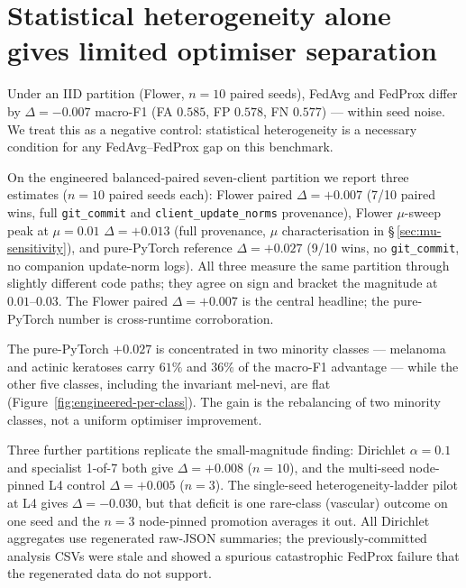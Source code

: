 \documentclass[11pt,a4paper]{report}
\begin{document}


\section{Statistical heterogeneity alone gives limited optimiser separation}
\label{sec:statistical-heterogeneity}

Under an IID partition (Flower, $n=10$ paired seeds), FedAvg and FedProx
differ by $\Delta = -0.007$ macro-F1 (FA $0.585$, FP $0.578$, FN $0.577$) ---
within seed noise. We treat this as a negative control: statistical
heterogeneity is a necessary condition for any FedAvg--FedProx gap on this
benchmark.

On the engineered balanced-paired seven-client partition we report three
estimates ($n=10$ paired seeds each): Flower paired $\Delta = +0.007$ (7/10
paired wins, full \texttt{git\_commit} and \texttt{client\_update\_norms}
provenance), Flower $\mu$-sweep peak at $\mu = 0.01$ $\Delta = +0.013$ (full
provenance, $\mu$ characterisation in \S\,\ref{sec:mu-sensitivity}), and
pure-PyTorch reference $\Delta = +0.027$ (9/10 wins, no \texttt{git\_commit},
no companion update-norm logs). All three measure the same partition through
slightly different code paths; they agree on sign and bracket the magnitude
at $0.01$--$0.03$. The Flower paired $\Delta = +0.007$ is the central
headline; the pure-PyTorch number is cross-runtime corroboration.

The pure-PyTorch $+0.027$ is concentrated in two minority classes --- melanoma
and actinic keratoses carry $61\%$ and $36\%$ of the macro-F1 advantage --- while
the other five classes, including the invariant mel-nevi, are flat
(Figure~\ref{fig:engineered-per-class}). The gain is the rebalancing of two
minority classes, not a uniform optimiser improvement.

Three further partitions replicate the small-magnitude finding: Dirichlet
$\alpha = 0.1$ and specialist 1-of-7 both give $\Delta = +0.008$ ($n=10$), and
the multi-seed node-pinned L4 control $\Delta = +0.005$ ($n=3$). The single-seed
heterogeneity-ladder pilot at L4 gives $\Delta = -0.030$, but that deficit is one
rare-class (vascular) outcome on one seed and the $n=3$ node-pinned promotion
averages it out. All Dirichlet aggregates use regenerated raw-JSON summaries; the
previously-committed analysis CSVs were stale and showed a spurious catastrophic
FedProx failure that the regenerated data do not support.
\end{document}
